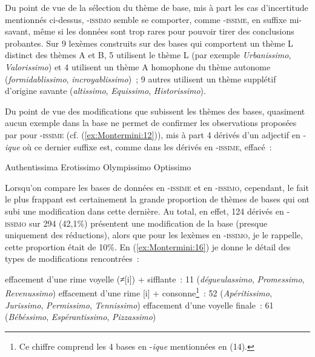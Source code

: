 \documentclass[output=paper]{langsci/langscibook}
\begin{document}
Du point de vue de la sélection du thème de base, mis à part les cas
d'incertitude mentionnés ci-dessus, \textsc{-issimo} semble se
comporter, comme -\textsc{issime}, en suffixe mi-savant, même si les
données sont trop rares pour pouvoir tirer des conclusions probantes.
Sur 9 lexèmes construits sur des bases qui comportent un thème L
distinct des thèmes A et B, 5 utilisent le thème L (par exemple
\emph{Urbanissimo}, \emph{Valorissimo}) et 4 utilisent un thème A
homophone du thème autonome (\emph{formidablissimo},
\emph{incroyablissimo})~; 9 autres utilisent un thème supplétif
d'origine savante (\emph{altissimo}, \emph{Equissimo},
\emph{Historissimo}).

Du point de vue des modifications que subissent les thèmes des bases,
quasiment aucun exemple dans la base ne permet de confirmer les
observations proposées par %
\citet{Plenat2002a} %
%
pour -\textsc{issime} (cf.
(\ref{ex:Montermini:12})), mis à part 4 dérivés d'un adjectif en -\emph{ique} où ce dernier
suffixe est, comme dans les dérivés en -\textsc{issime}, effacé~:

\ea \label{ex:Montermini:15}
  \ea \label{ex:Montermini:15a} {Authentissima}
  \ex \label{ex:Montermini:15b}  {Erotissimo}
  \ex \label{ex:Montermini:15c}  {Olympissimo}
  \ex \label{ex:Montermini:15d}  {Optissimo}
\z\z


Lorsqu'on compare les bases de données en -\textsc{issime} et en
-\textsc{issimo}, cependant, le fait le plus frappant est certainement
la grande proportion de thèmes de bases qui ont subi une modification
dans cette dernière. Au total, en effet, 124 dérivés en -\textsc{issimo}
sur 294 (42,1\%) présentent une modification de la base (presque
uniquement des réductions), alors que pour les lexèmes en
-\textsc{issimo}, je le rappelle, cette proportion était de 10\%. En
(\ref{ex:Montermini:16}) je donne le détail des types de modifications rencontrées~:

\ea \label{ex:Montermini:16}
  \ea \label{ex:Montermini:16a} effacement d'une rime voyelle (≠{[}i{]}) + sifflante~: 11
  (\emph{dégueulassimo}, \emph{Promessimo}, \emph{Revenussimo})
  \ex \label{ex:Montermini:16b}  effacement d'une rime {[}i{]} + consonne\footnote{Ce chiffre comprend
    les 4 bases en -\emph{ique} mentionnées en (14).}~: 52
  (\emph{Apéritissimo}, \emph{Jurissimo}, \emph{Permissimo},
  \emph{Tennissimo})
  \ex \label{ex:Montermini:16c}  effacement d'une voyelle finale~: 61 (\emph{Bébéssimo},
  \emph{Espérantissimo}, \emph{Pizzassimo})
\z\z
\end{document}
